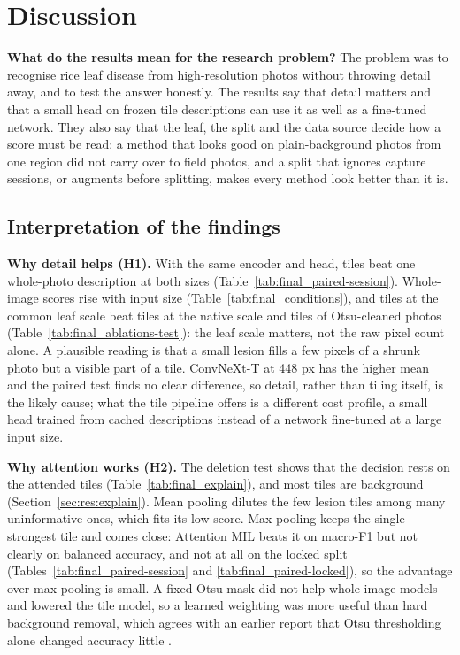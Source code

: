 \section{Discussion}
\label{sec:discussion}

\textbf{What do the results mean for the research problem?} The problem was to recognise rice leaf disease from
high-resolution photos without throwing detail away, and to test the answer honestly. The results say that detail matters
and that a small head on frozen tile descriptions can use it as well as a fine-tuned network. They also say that the leaf,
the split and the data source decide how a score must be read: a method that looks good on plain-background photos from one
region did not carry over to field photos, and a split that ignores capture sessions, or augments before splitting, makes
every method look better than it is.

\subsection{Interpretation of the findings}

\textbf{Why detail helps (H1).} With the same encoder and head, tiles beat one whole-photo description at both sizes
(Table~\ref{tab:final_paired-session}). Whole-image scores rise with input size (Table~\ref{tab:final_conditions}), and tiles
at the common leaf scale beat tiles at the native scale and tiles of Otsu-cleaned photos
(Table~\ref{tab:final_ablations-test}): the leaf scale matters, not the raw pixel count alone. A plausible reading is that
a small lesion fills a few pixels of a shrunk photo but a visible part of a tile. ConvNeXt-T at 448 px has the higher mean
and the paired test finds no clear difference, so detail, rather than tiling itself, is the likely cause; what the tile
pipeline offers is a different cost profile, a small head trained from cached descriptions instead of a network fine-tuned
at a large input size.

\textbf{Why attention works (H2).} The deletion test shows that the decision rests on the attended tiles
(Table~\ref{tab:final_explain}), and most tiles are background (Section~\ref{sec:res:explain}). Mean pooling dilutes the few
lesion tiles among many uninformative ones, which fits its low score. Max pooling keeps the single strongest tile and comes
close: Attention MIL beats it on macro-F1 but not clearly on balanced accuracy, and not at all on the locked split
(Tables~\ref{tab:final_paired-session} and \ref{tab:final_paired-locked}), so the advantage over max pooling is small. A
fixed Otsu mask did not help whole-image models and lowered the tile model, so a learned weighting was more useful than hard
background removal, which agrees with an earlier report that Otsu thresholding alone changed accuracy little
\cite{ali2026}.

